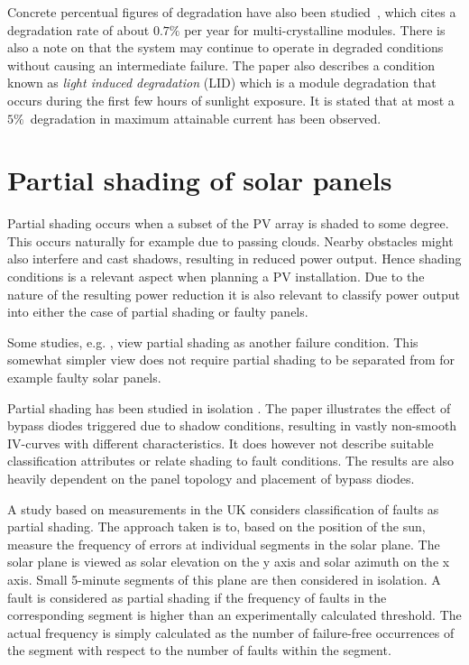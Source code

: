 Concrete percentual figures of degradation have also been studied~\cite{Quintana2002}, which cites a degradation rate of about $0.7\%$ per year for multi-crystalline modules.
There is also a note on that the system may continue to operate in degraded conditions without causing an intermediate failure.
The paper also describes a condition known as \emph{light induced degradation} (LID) which is a module degradation
that occurs during the first few hours of sunlight exposure.
It is stated that at most a $5\%$ degradation in maximum attainable current has been observed.

\section{Partial shading of solar panels}
Partial shading occurs when a subset of the PV array is shaded to some degree.
This occurs naturally for example due to passing clouds.
Nearby obstacles might also interfere and cast shadows, resulting in reduced power output.
Hence shading conditions is a relevant aspect when planning a PV installation.
Due to the nature of the resulting power reduction it is also relevant to classify power output into either the case of partial shading or faulty panels.

Some studies, e.g. \cite{Stettler2005}, view partial shading as another failure condition.
This somewhat simpler view does not require partial shading to be separated from for example faulty solar panels.

Partial shading has been studied in isolation \cite{Alsayid2013}.
The paper illustrates the effect of bypass diodes triggered due to shadow conditions, resulting in vastly non-smooth IV-curves with different characteristics.
It does however not describe suitable classification attributes or relate shading to fault conditions.
The results are also heavily dependent on the panel topology and placement of bypass diodes.

A study based on measurements in the UK \cite{Firth2010} considers classification of faults as partial shading.
The approach taken is to, based on the position of the sun, measure the frequency of errors at individual segments in the solar plane.
The solar plane is viewed as solar elevation on the y axis and solar azimuth on the x axis.
Small 5-minute segments of this plane are then considered in isolation.
A fault is considered as partial shading if the frequency of faults in the corresponding segment is higher than an experimentally calculated threshold.
The actual frequency is simply calculated as the number of failure-free occurrences of the segment with respect to the number of faults within the segment.

